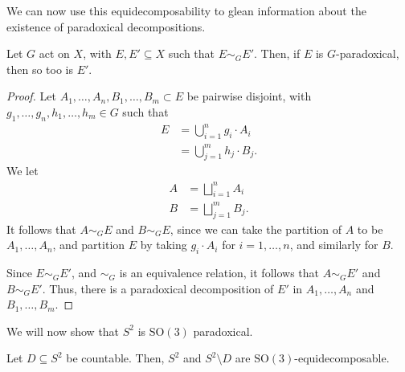 We can now use this equidecomposability to glean information about the existence of paradoxical decompositions.
\begin{proposition}
  Let $G$ act on $X$, with $E,E'\subseteq X$ such that $E\sim_{G}E'$. Then, if $E$ is $G$-paradoxical, then so too is $E'$.
\end{proposition}

\begin{proof}
Let $A_1,\dots,A_n,B_1,\dots,B_m\subset E$ be pairwise disjoint, with $g_1,\dots,g_n,h_1,\dots,h_m\in G$ such that
\begin{align*}
  E &= \bigcup_{i=1}^{n}g_i\cdot A_i\\
    &= \bigcup_{j=1}^{m}h_j\cdot B_j.
\end{align*}
We let
\begin{align*}
  A &= \bigsqcup_{i=1}^{n}A_i\\
  B &= \bigsqcup_{j=1}^{m}B_j.
\end{align*}
It follows that $A\sim_{G}E$ and $B\sim_{G}E$, since we can take the partition of $A$ to be $A_1,\dots,A_n$, and partition $E$ by taking $g_i\cdot A_i$ for $i=1,\dots,n$, and similarly for $B$.\newline

Since $E\sim_{G}E'$, and $\sim_{G}$ is an equivalence relation, it follows that $A\sim_{G}E'$ and $B\sim_{G}E'$. Thus, there is a paradoxical decomposition of $E'$ in $A_1,\dots,A_n$ and $B_1,\dots,B_m$.
\end{proof}

We will now show that $S^{2}$ is $\text{SO}(3)$ paradoxical.
\begin{proposition}
  Let $D\subseteq S^{2}$ be countable. Then, $S^{2}$ and $S^{2}\setminus D$ are $\text{SO}(3)$-equidecomposable.
\end{proposition}

